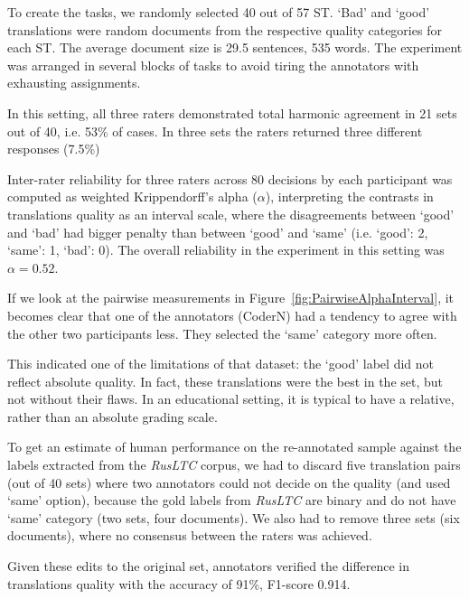 
To create the tasks, we randomly selected 40 out of 57 ST. `Bad' and `good' translations were random documents from the respective quality categories for each ST. The average document size is 29.5 sentences, 535 words.  
The experiment was arranged in several blocks of tasks to avoid tiring the annotators with exhausting assignments. 

In this setting, all three raters demonstrated total harmonic agreement in 21 sets out of 40, i.e. 53\% of cases. In three sets the raters returned three different responses (7.5\%)

Inter-rater reliability for three raters across 80 decisions by each participant was computed as weighted Krippendorff's alpha ($\alpha$), interpreting the contrasts in translations quality as an interval scale, where the disagreements between `good' and `bad' had bigger penalty than between `good' and `same' (i.e. `good': 2, `same': 1, `bad': 0). The overall reliability in the experiment in this setting was $\alpha=0.52$.

If we look at the pairwise measurements in Figure~\ref{fig:PairwiseAlphaInterval}, it becomes clear that one of the annotators (CoderN) had a tendency to agree with the other two participants less. They selected  the `same' category more often. 
\vspace{-2em}

This indicated one of the limitations of that dataset: the `good' label did not reflect absolute quality. In fact, these translations were the best in the set, but not without their flaws. 
In an educational setting, it is typical to have a relative, rather than an absolute grading scale.   

To get an estimate of human performance on the re-annotated sample against the labels extracted from the \textit{RusLTC} corpus, we had to discard five translation pairs (out of 40 sets) where two annotators could not decide on the quality (and used `same' option), because the gold labels from \textit{RusLTC} are binary and do not have `same' category (two sets, four documents). We also had to remove three sets (six documents), where no consensus between the raters was achieved. 

Given these edits to the original set, annotators verified the difference in translations quality with the accuracy of 91\%, F1-score 0.914.

